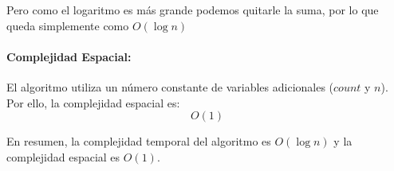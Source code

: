 Pero como el logaritmo es más grande podemos quitarle la suma, por lo que queda simplemente como \textbf{$O(\log n)$}

\paragraph{Complejidad Espacial:}
El algoritmo utiliza un número constante de variables adicionales ($count$ y $n$). Por ello, la complejidad espacial es:
\[
O(1)
\]

En resumen, la complejidad temporal del algoritmo es $O(\log n)$ y la complejidad espacial es $O(1)$. 
